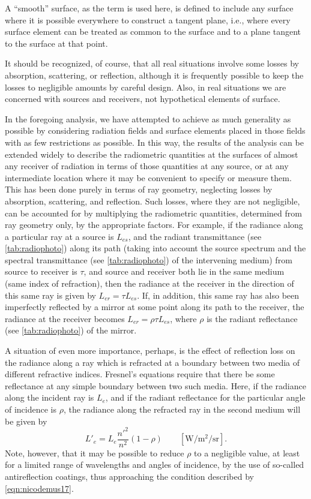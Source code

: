 A “smooth” surface, as the term is used here, is defined to include any
surface where it is possible everywhere to construct a tangent plane,
i.e., where every surface element can be treated as common to the
surface and to a plane tangent to the surface at that point.

It should be recognized, of course, that all real situations involve
some losses by absorption, scattering, or reflection, although it is
frequently possible to keep the losses to negligible amounts
by careful design. Also, in real situations we are concerned with sources
and receivers, not hypothetical elements of surface.

In the foregoing analysis, we have attempted to achieve as much generality
as possible by considering radiation fields and surface elements placed in
those fields with as few restrictions as possible. In this way, the results
of the analysis can be extended widely to describe the radiometric quantities
at the surfaces of almost any receiver of radiation in terms of those quantities
at any source, or at any intermediate location where it may be convenient to specify or measure
them. This has been done purely in terms of ray geometry, neglecting losses
by absorption, scattering, and reflection. Such losses, where they are
not negligible, can be accounted for by multiplying the radiometric quantities,
determined from ray geometry only, by the appropriate factors.
For example, if the radiance along a particular ray at a source is
$L_{es}$, and the radiant transmittance (see \cref{tab:radiophoto}) along
its path (taking into account the source spectrum and the spectral transmittance
(see \cref{tab:radiophoto}) of the intervening medium) from source to
receiver is $\tau$, and source and receiver both lie in the same medium (same
index of refraction), then the radiance at the receiver in the direction of
this same ray is given by $L_{er} = \tau L_{es}$. If, in addition, this same
ray has also been imperfectly reflected by a mirror at some point along its
path to the receiver, the radiance at the receiver becomes $L_{er} = \rho \tau L_{es}$,
where $\rho$ is the radiant reflectance (see \cref{tab:radiophoto}) of
the mirror.

A situation of even more importance, perhaps, is the effect of reflection loss
on the radiance along a ray which is refracted at a boundary between two media
of different refractive indices.
Fresnel’s equations require that there be some reflectance at any simple
boundary between two such media. Here, if the radiance along the incident ray
is $L_e$, and if the radiant reflectance for the particular angle of incidence
is $\rho$, the radiance along the refracted ray in the second medium
will be given by
\begin{equation}
L'_e = L_e \frac{n'^2}{n^2} (1-\rho)
\qquad \left[\si{\watt\per\square\meter\per\steradian}\right].
\end{equation}
Note, however, that it may be possible to reduce $\rho$ to a negligible value,
at least for a limited range of wavelengths and angles of incidence, by the
use of so-called antireflection coatings, thus approaching the condition
described by \cref{eqn:nicodemus17}.

